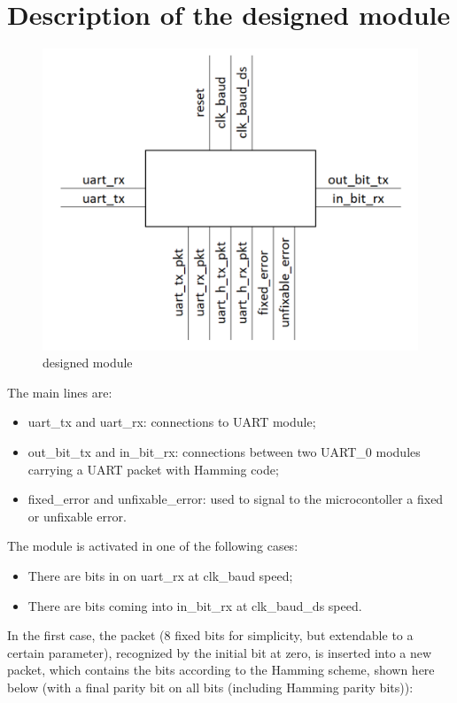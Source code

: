 \documentclass[11pt]{article}
\begin{document}
	\section{Description of the designed module}
	\begin{figure}[H]
	\begin{center}
		\includegraphics[scale=0.5]{module schem}
		\caption{designed module}	
	\end{center}
	\end{figure}
	The main lines are:
	\begin{itemize}
		\item uart\_tx and uart\_rx: connections to UART module;
		\item out\_bit\_tx and in\_bit\_rx: connections between two UART\_0 modules carrying a UART packet with Hamming code;
		\item fixed\_error and unfixable\_error: used to signal to the microcontoller a fixed or unfixable error.
	\end{itemize}
	The module is activated in one of the following cases:
	\begin{itemize}
	\item There are bits in on uart\_rx at clk\_baud speed;
	\item There are bits coming into in\_bit\_rx at clk\_baud\_ds speed.
	\end{itemize}
	In the first case, the packet (8 fixed bits for simplicity, but extendable to a certain parameter), recognized by the initial bit at zero, is inserted into a new packet, which contains the bits according to the Hamming scheme, shown here below (with a final parity bit on all bits (including Hamming parity bits)):
\end{document}
